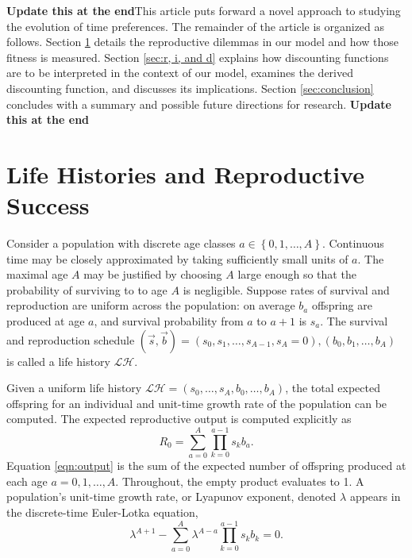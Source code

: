 \documentclass[titlepage, hidelinks, 12pt]{article}
\theoremstyle{plain}
\theoremstyle{remark}
\theoremstyle{definition}
\newcommand{\LH}{\mathcal{LH}}
\begin{document}
\textbf{Update this at the end}This article puts forward a novel approach to studying the evolution of time preferences. The remainder of the article is organized
as follows. Section \ref{sec:lh, rs, and f} details the reproductive dilemmas in our model and how those fitness is measured.  
Section \ref{sec:r, i, and d} explains how discounting functions are to be interpreted in the context of our model, examines
the derived discounting function, and discusses its implications. Section \ref{sec:conclusion} concludes with a summary and possible future
directions for research. 
\textbf{Update this at the end}



\section{Life Histories and Reproductive Success} \label{sec:lh, rs, and f}

Consider a population with discrete age classes $a\in\left\{ 0, 1, \ldots, A \right\}$. 
Continuous time may be closely  approximated by taking sufficiently small units of $a$.
The maximal age $A$ may be justified by choosing $A$ large enough so that the probability of surviving to to age $A$ is negligible. 
Suppose rates of survival and reproduction are uniform across the population: 
on average $b_a$ offspring are produced at age $a$, and survival probability from $a$
to $a+1$ is $s_a$. The survival and reproduction schedule $(\vec{s}, \vec{b}) = (s_0, s_1, \ldots, s_{A-1}, s_A = 0), (b_0, b_1, 
\ldots, b_A)$ is called a life history $\LH$. 

Given a uniform life history $\LH = (s_0, \ldots, s_A, b_0, \ldots, b_A)$, the total expected offspring for an individual and unit-time 
growth rate of the population can be computed. 
The expected reproductive output is computed explicitly as
\begin{equation}
    R_0 = \sum\limits_{a = 0}^A \prod\limits_{k = 0}^{a-1} s_k b_a.
    \label{eqn:output}
\end{equation}
Equation \ref{eqn:output} is the sum of the expected number of offspring produced at each age $a= 0, 1, \ldots, A$. 
Throughout, the empty product evaluates to 1. 
A population's unit-time growth rate, or Lyapunov exponent, denoted $\lambda$
appears in the discrete-time Euler-Lotka equation,
\begin{equation}
    \lambda^{A+1} - \sum\limits_{a = 0}^A \lambda^{A-a} \prod\limits_{k = 0}^{a-1}s_k b_k= 0.
    \label{eqn:euler-lotka}
\end{equation}
\end{document}
